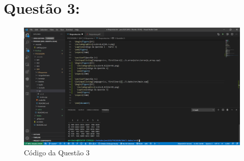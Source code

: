 \documentclass{article}
\begin{document}
\section*{Questão 3:}

\begin{figure}[h!]
  \includegraphics[scale=0.42]{dados.png}
  \caption{Código da Questão 3}
  \end{figure}
\vspace{15mm}
\end{document}

